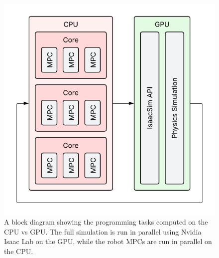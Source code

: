 \begin{figure}
  \centering
  \includegraphics[width=0.5\linewidth]{images/diagrams/processing-flow.png}
  \caption{A block diagram showing the programming tasks computed on
    the CPU vs GPU. The full simulation is run in parallel using Nvidia
  Isaac Lab on the GPU, while the robot MPCs are run in parallel on the CPU.}
  \label{fig:diagram-processing-flow}
\end{figure}
